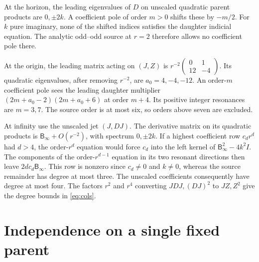 \documentclass[11pt]{article}
\begin{document}
At the horizon, the leading eigenvalues of \(D\) on unscaled quadratic parent products are \(0,\pm 2k\).
A coefficient pole of order \(m>0\) shifts these by \(-m/2\).
For \(k\) pure imaginary, none of the shifted indices satisfies the daughter indicial equation.
The analytic odd--odd source at \(r=2\) therefore allows no coefficient pole there.

At the origin, the leading matrix acting on \((J,Z)\) is
\(r^{-2}\left(\begin{smallmatrix}0&1\\12&-4\end{smallmatrix}\right)\).
Its quadratic eigenvalues, after removing \(r^{-2}\), are \(a_0=4,-4,-12\).
An order-\(m\) coefficient pole sees the leading daughter multiplier
\((2m+a_0-2)(2m+a_0+6)\) at order \(m+4\).
Its positive integer resonances are \(m=3,7\).
The source order is at most six, so orders above seven are excluded.

At infinity use the unscaled jet \((J,DJ)\).
The derivative matrix on its quadratic products is
\(\mathsf B_\infty+O(r^{-2})\), with spectrum \(0,\pm2k\).
If a highest coefficient row \(c_dr^d\) had \(d>4\), the order-\(r^d\) equation would force \(c_d\) into the left kernel of
\(\mathsf B_\infty^2-4k^2 I\).
The components of the order-\(r^{d-1}\) equation in its two resonant directions then leave \(2d c_d\mathsf B_\infty\).
This row is nonzero since \(c_d\ne0\) and \(k\ne0\), whereas the source remainder has degree at most three.
The unscaled coefficients consequently have degree at most four.
The factors \(r^2\) and \(r^4\) converting \(JDJ,(DJ)^2\) to \(JZ,Z^2\) give the degree bounds in \eqref{eq:cols}.

\section{Independence on a single fixed parent}
\label{app:independence}
\end{document}
